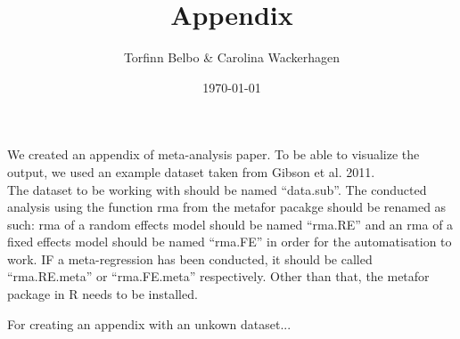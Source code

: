 \documentclass[11pt, a4paper]{article}
\begin{document}
\title{Appendix}
\author{Torfinn Belbo \& Carolina Wackerhagen}

\date{\today}

\maketitle

We created an appendix of meta-analysis paper. To be able to visualize the output, we used an example dataset taken from Gibson et al. 2011.\\ 

The dataset to be working with should be named ``data.sub''. The conducted analysis using the function rma from the metafor pacakge should be renamed as such: rma of a random effects model should be named ``rma.RE'' and an rma of a fixed effects model should be named ``rma.FE'' in order for the automatisation to work. IF a meta-regression has been conducted, it should be called ``rma.RE.meta'' or ``rma.FE.meta'' respectively. Other than that, the metafor package in R needs to be installed.  

For creating an appendix with an unkown dataset... 
\end{document}
